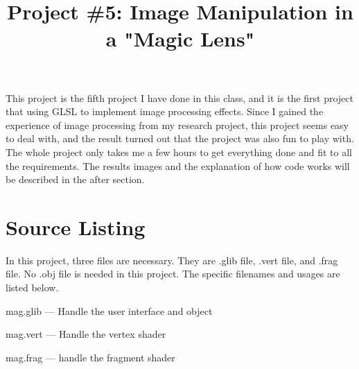 \documentclass[letterpaper,14pt,titlepage,fleqn]{article}
\author{\name}
\title{Project \#5: Image Manipulation in a "Magic Lens"}
\begin{document}
\maketitle

This project is the fifth project I have done in this class, and it is the first project that using GLSL to implement image processing effects. Since I gained the experience of image processing from my research project, this project seems easy to deal with, and the result turned out that the project was also fun to play with. The whole project only takes me a few hours to get everything done and fit to all the requirements. The results images and the explanation of how code works will be described in the after section. 

\section{Source Listing}
In this project, three files are necessary. They are .glib file, .vert file, and .frag file. No .obj file is needed in this project. The specific filenames and usages are listed below.

mag.glib --- Handle the user interface and object

mag.vert --- Handle the vertex shader

mag.frag --- handle the fragment shader
\end{document}
